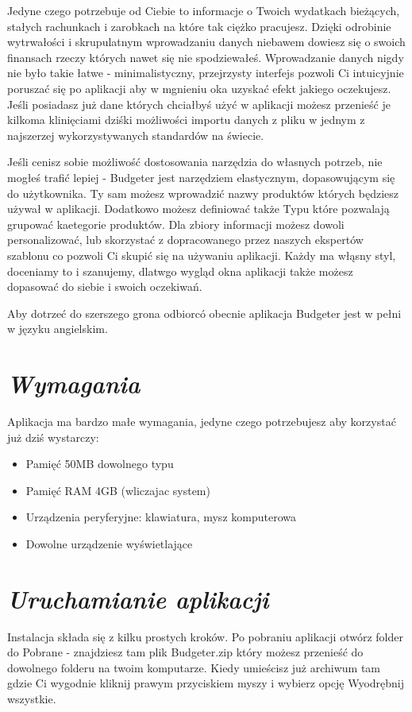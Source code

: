 \documentclass[a4paper,10pt, twoside]{report}
\newcommand{\customstylesection}[1]{\textbf{\textit{#1}}}
\begin{document}
{Jedyne czego potrzebuje od Ciebie to informacje o Twoich wydatkach bieżących, 
stałych rachunkach i zarobkach na które tak ciężko pracujesz. Dzięki odrobinie 
wytrwałości i skrupulatnym wprowadzaniu danych niebawem dowiesz się o swoich 
finansach rzeczy których nawet się nie spodziewałeś. Wprowadzanie danych nigdy 
nie było takie łatwe - minimalistyczny, przejrzysty interfejs pozwoli Ci 
intuicyjnie poruszać się po aplikacji aby w mgnieniu oka uzyskać efekt jakiego 
oczekujesz. Jeśli posiadasz już dane których chciałbyś użyć w aplikacji możesz
przenieść je kilkoma klinięciami dziśki możliwości importu danych z pliku w 
jednym z najszerzej wykorzystywanych standardów na świecie.}

{Jeśli cenisz sobie możliwość dostosowania narzędzia do własnych potrzeb, nie 
mogłeś trafić lepiej - Budgeter jest narzędziem elastycznym, dopasowującym się 
do użytkownika. Ty sam możesz wprowadzić nazwy produktów których będziesz używał
w aplikacji. Dodatkowo możesz definiować także Typu które pozwalają grupować 
kaetegorie produktów. Dla zbiory informacji możesz dowoli personalizować, lub 
skorzystać z dopracowanego przez naszych ekspertów szablonu co pozwoli Ci skupić
 się na używaniu aplikacji. Każdy ma włąsny styl, doceniamy to i szanujemy, 
 dlatwgo wygląd okna aplikacji także możesz dopasować do siebie i swoich 
 oczekiwań.}

 {Aby dotrzeć do szerszego grona odbiorcó obecnie aplikacja Budgeter jest w 
 pełni w języku angielskim.}

\section{\customstylesection{Wymagania}}
{Aplikacja ma bardzo małe wymagania, jedyne czego potrzebujesz aby korzystać 
już dziś wystarczy:}

\begin{minipage}{\textwidth}
    \begin{itemize}
        \item Pamięć 50MB dowolnego typu
        \item Pamięć RAM 4GB (wliczajac system)
        \item Urządzenia peryferyjne: klawiatura, mysz komputerowa
        \item Dowolne urządzenie wyświetlające
    \end{itemize}
\end{minipage}

\section{\customstylesection{Uruchamianie aplikacji}}
{Instalacja składa się z kilku prostych kroków. Po pobraniu aplikacji otwórz 
folder do Pobrane - znajdziesz tam plik Budgeter.zip który możesz przenieść do 
dowolnego folderu na twoim komputarze. Kiedy umieścisz już archiwum tam gdzie Ci
 wygodnie kliknij prawym przyciskiem myszy i wybierz opcję Wyodrębnij wszystkie.}
\end{document}
